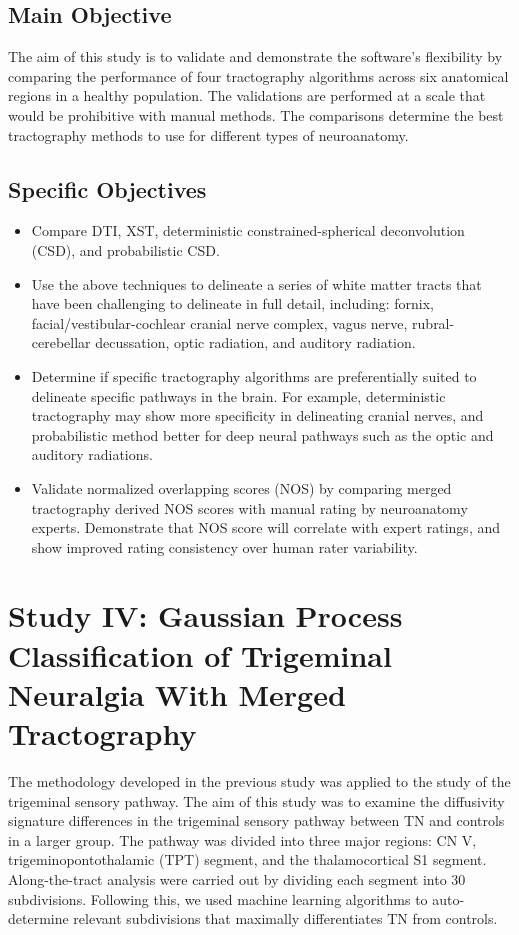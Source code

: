 \subsection{Main Objective}
The aim of this study is to validate and demonstrate the software's flexibility by comparing the performance of four tractography algorithms across six anatomical regions in a healthy population. The validations are performed  at a scale that would be prohibitive with manual methods. The comparisons determine the best tractography methods to use for different types of neuroanatomy.

\subsection{Specific Objectives}
\begin{itemize}
    \item Compare DTI, XST, deterministic constrained-spherical deconvolution (CSD), and probabilistic CSD. 
    
    \item Use the above techniques to delineate a series of white matter tracts that have been challenging to delineate in full detail, including: fornix, facial/vestibular-cochlear cranial nerve complex, vagus nerve, rubral-cerebellar decussation, optic radiation, and auditory radiation.
    
    \item Determine if specific tractography algorithms are preferentially suited to delineate specific pathways in the brain. For example, deterministic tractography may show more specificity in delineating cranial nerves, and probabilistic method better for deep neural pathways such as the optic and auditory radiations.
    
    \item Validate normalized overlapping scores (NOS) by comparing merged tractography derived NOS scores with manual rating by neuroanatomy experts. Demonstrate that NOS score will correlate with expert ratings, and show improved rating consistency over human rater variability.

\end{itemize}

\section{Study IV: Gaussian Process Classification of Trigeminal Neuralgia With Merged Tractography}
The methodology developed in the previous study was applied to the study of the trigeminal sensory pathway. The aim of this study was to examine the diffusivity signature differences in the trigeminal sensory pathway between TN and controls in a larger group. The pathway was divided into three major regions: CN V, trigeminopontothalamic (TPT) segment, and the thalamocortical S1 segment. Along-the-tract analysis were carried out by dividing each segment into 30 subdivisions. Following this, we used machine learning algorithms to auto-determine relevant subdivisions that maximally differentiates TN from controls.

